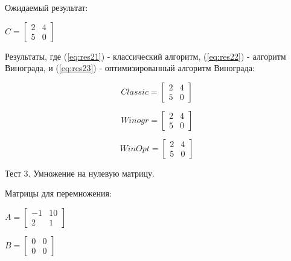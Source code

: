 \documentclass[12pt,a4paper]{scrartcl}
\begin{document}
Ожидаемый результат:

\begin{center}
		\begin{math}\label{eq:res2}
		C =\begin{bmatrix}
		2 & 4 \\
		5 & 0
		\end{bmatrix}
		\end{math}
\end{center}

Результаты, где (\ref{eq:res21}) - классический алгоритм, (\ref{eq:res22}) - алгоритм Винограда, и (\ref{eq:res23}) - оптимизированный алгоритм Винограда:

\begin{center}
	\begin{minipage}[c][3cm][c]{0,3\textwidth}
		\begin{equation}\label{eq:res21}
		Classic =\begin{bmatrix}
		2 & 4 \\ 
		5 & 0
		\end{bmatrix}
		\end{equation}
	\end{minipage}	
	\begin{minipage}[c][3cm][c]{0,3\textwidth}
		\begin{equation}\label{eq:res22}
		Winogr =\begin{bmatrix}
		2 & 4 \\
		5 & 0
		\end{bmatrix}
		\end{equation}
	\end{minipage}	
	\begin{minipage}[c][3cm][c]{0,3\textwidth}
		\begin{equation}\label{eq:res23}
		WinOpt =\begin{bmatrix}
		2 & 4 \\ 
		5 & 0
		\end{bmatrix}
		\end{equation}
	\end{minipage}
\end{center}


Тест 3. Умножение на нулевую матрицу.

Матрицы для перемножения:

\begin{minipage}[c][3cm][c]{0,5\textwidth}
	\begin{math}\label{eq:test31}
	A =\begin{bmatrix}
	-1 & 10 \\
	2 & 1
	\end{bmatrix}
	\end{math}
\end{minipage}
\begin{minipage}[c][3cm][c]{0,5\textwidth}
	\begin{math}\label{eq:test32}
	B =\begin{bmatrix}
	0 & 0 \\
	0 & 0 
	\end{bmatrix}
	\end{math}
\end{minipage}
\end{document}
